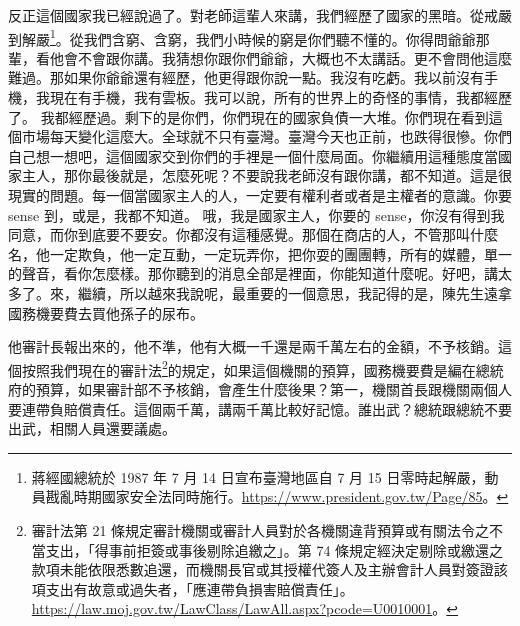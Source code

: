 \hypertarget{c11:cue:18}{}反正這個國家我已經說過了。對老師這輩人來講，我們經歷了國家的黑暗。從戒嚴到解嚴\footnote{蔣經國總統於 1987 年 7 月 14 日宣布臺灣地區自 7 月 15 日零時起解嚴，動員戡亂時期國家安全法同時施行。\url{https://www.president.gov.tw/Page/85}。}。從我們含窮、含窮，我們小時候的窮是你們聽不懂的。你得問爺爺那輩，看他會不會跟你講。我猜想你跟你們爺爺，大概也不太講話。更不會問他這麼難過。那如果你爺爺還有經歷，他更得跟你說一點。我沒有吃虧。我以前沒有手機，我現在有手機，我有雲板。我可以說，所有的世界上的奇怪的事情，我都經歷了。
\hypertarget{c11:cue:19}{}我都經歷過。剩下的是你們，你們現在的國家負債一大堆。你們現在看到這個市場每天變化這麼大。全球就不只有臺灣。臺灣今天也正前，也跌得很慘。你們自己想一想吧，這個國家交到你們的手裡是一個什麼局面。你繼續用這種態度當國家主人，那你最後就是，怎麼死呢？不要說我老師沒有跟你講，都不知道。這是很現實的問題。每一個當國家主人的人，一定要有權利者或者是主權者的意識。你要 sense 到，或是，我都不知道。
\hypertarget{c11:cue:20}{}哦，我是國家主人，你要的 sense，你沒有得到我同意，而你到底要不要安。你都沒有這種感覺。那個在商店的人，不管那叫什麼名，他一定欺負，他一定互動，一定玩弄你，把你耍的團團轉，所有的媒體，單一的聲音，看你怎麼樣。那你聽到的消息全部是裡面，你能知道什麼呢。好吧，講太多了。來，繼續，所以越來我說呢，最重要的一個意思，我記得的是，陳先生遠拿國務機要費去買他孫子的尿布。

\hypertarget{c11:cue:21}{}他審計長報出來的，他不準，他有大概一千還是兩千萬左右的金額，不予核銷。這個按照我們現在的審計法\footnote{審計法第 21 條規定審計機關或審計人員對於各機關違背預算或有關法令之不當支出，「得事前拒簽或事後剔除追繳之」。第 74 條規定經決定剔除或繳還之款項未能依限悉數追還，而機關長官或其授權代簽人及主辦會計人員對簽證該項支出有故意或過失者，「應連帶負損害賠償責任」。\url{https://law.moj.gov.tw/LawClass/LawAll.aspx?pcode=U0010001}。}的規定，如果這個機關的預算，國務機要費是編在總統府的預算，如果審計部不予核銷，會產生什麼後果？第一，機關首長跟機關兩個人要連帶負賠償責任。這個兩千萬，講兩千萬比較好記憶。誰出武？總統跟總統不要出武，相關人員還要議處。

